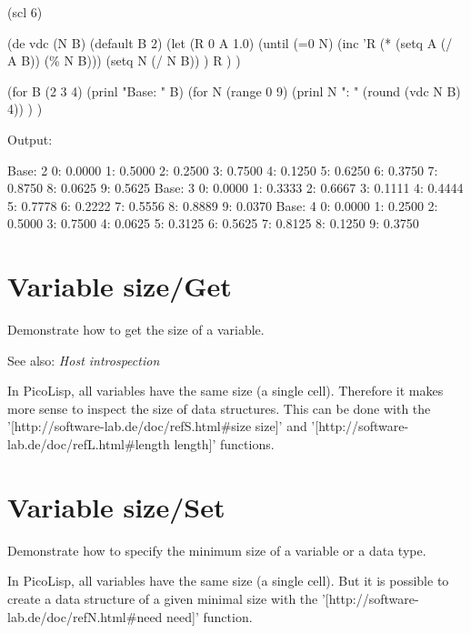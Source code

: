 \begin{wideverbatim}

(scl 6)

(de vdc (N B)
   (default B 2)
   (let (R 0  A 1.0)
      (until (=0 N)
         (inc 'R (* (setq A (/ A B)) (\% N B)))
         (setq N (/ N B)) )
      R ) )

(for B (2 3 4)
   (prinl "Base: " B)
   (for N (range 0 9)
      (prinl N ": " (round (vdc N B) 4)) ) )

Output:

Base: 2
0: 0.0000
1: 0.5000
2: 0.2500
3: 0.7500
4: 0.1250
5: 0.6250
6: 0.3750
7: 0.8750
8: 0.0625
9: 0.5625
Base: 3
0: 0.0000
1: 0.3333
2: 0.6667
3: 0.1111
4: 0.4444
5: 0.7778
6: 0.2222
7: 0.5556
8: 0.8889
9: 0.0370
Base: 4
0: 0.0000
1: 0.2500
2: 0.5000
3: 0.7500
4: 0.0625
5: 0.3125
6: 0.5625
7: 0.8125
8: 0.1250
9: 0.3750

\end{wideverbatim}

\pagebreak{}
\section*{Variable size/Get}

Demonstrate how to get the size of a variable.

See also: \emph{Host introspection}

\begin{wideverbatim}

In PicoLisp, all variables have the same size (a single cell). Therefore it
makes more sense to inspect the size of data structures. This can be done with
the '[http://software-lab.de/doc/refS.html#size size]' and
'[http://software-lab.de/doc/refL.html#length length]' functions.

\end{wideverbatim}

\pagebreak{}
\section*{Variable size/Set}

Demonstrate how to specify the minimum size of a variable or a data
type.

\begin{wideverbatim}

In PicoLisp, all variables have the same size (a single cell). But it is
possible to create a data structure of a given minimal size with the
'[http://software-lab.de/doc/refN.html#need need]' function.

\end{wideverbatim}

